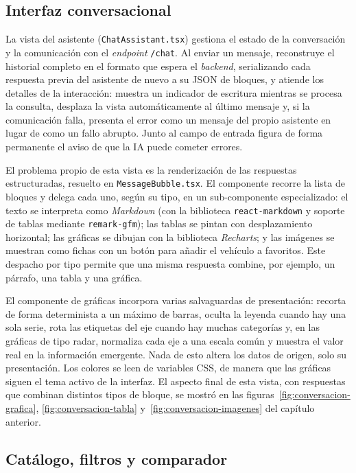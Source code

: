 \subsection{Interfaz conversacional}
\label{sec:impl-frontend-chat}

La vista del asistente (\texttt{ChatAssistant.tsx}) gestiona el estado de la
conversación y la comunicación con el \emph{endpoint} \texttt{/chat}. Al enviar un
mensaje, reconstruye el historial completo en el formato que espera el
\emph{backend}, serializando cada respuesta previa del asistente de nuevo a su JSON
de bloques, y atiende los detalles de la interacción: muestra un indicador de
escritura mientras se procesa la consulta, desplaza la vista automáticamente al
último mensaje y, si la comunicación falla, presenta el error como un mensaje del
propio asistente en lugar de como un fallo abrupto. Junto al campo de entrada
figura de forma permanente el aviso de que la IA puede cometer errores.

El problema propio de esta vista es la renderización de las respuestas
estructuradas, resuelto en \texttt{MessageBubble.tsx}. El componente recorre la
lista de bloques y delega cada uno, según su tipo, en un sub-componente
especializado: el texto se interpreta como \emph{Markdown} (con la biblioteca
\texttt{react-markdown} y soporte de tablas mediante \texttt{remark-gfm}); las
tablas se pintan con desplazamiento horizontal; las gráficas se dibujan con la
biblioteca \emph{Recharts}; y las imágenes se muestran como fichas con un botón
para añadir el vehículo a favoritos. Este despacho por tipo permite que una misma
respuesta combine, por ejemplo, un párrafo, una tabla y una gráfica.

El componente de gráficas incorpora varias salvaguardas de presentación: recorta
de forma determinista a un máximo de barras, oculta la leyenda cuando hay una sola
serie, rota las etiquetas del eje cuando hay muchas categorías y, en las gráficas
de tipo radar, normaliza cada eje a una escala común y muestra el valor real en la
información emergente. Nada de esto altera los datos de origen, solo su
presentación. Los colores se leen de variables CSS, de manera que las gráficas
siguen el tema activo de la interfaz. El aspecto final de esta vista, con
respuestas que combinan distintos tipos de bloque, se mostró en las
figuras~\ref{fig:conversacion-grafica}, \ref{fig:conversacion-tabla}
y~\ref{fig:conversacion-imagenes} del capítulo anterior.

\subsection{Catálogo, filtros y comparador}
\label{sec:impl-frontend-catalogo}

